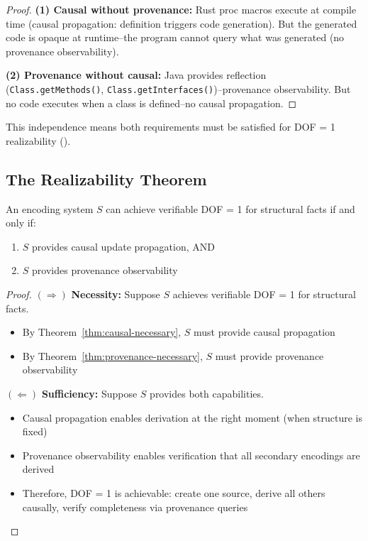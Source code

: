 \begin{proof}
\textbf{(1) Causal without provenance:} Rust proc macros execute at compile time (causal propagation: definition triggers code generation). But the generated code is opaque at runtime--the program cannot query what was generated (no provenance observability).

\textbf{(2) Provenance without causal:} Java provides reflection (\texttt{Class.getMethods()}, \texttt{Class.getInterfaces()})--provenance observability. But no code executes when a class is defined--no causal propagation.
\end{proof}

This independence means both requirements must be satisfied for DOF = 1 realizability ().

\subsection{The Realizability Theorem}\label{sec:realizability-theorem}

\begin{theorem}\label{thm:ssot-iff}
An encoding system $S$ can achieve verifiable DOF = 1 for structural facts if and only if:
\begin{enumerate}
\tightlist
\item $S$ provides causal update propagation, AND
\item $S$ provides provenance observability
\end{enumerate}
\end{theorem}

\begin{proof}
$(\Rightarrow)$ \textbf{Necessity:} Suppose $S$ achieves verifiable DOF = 1 for structural facts.
\begin{itemize}
\tightlist
\item By Theorem~\ref{thm:causal-necessary}, $S$ must provide causal propagation
\item By Theorem~\ref{thm:provenance-necessary}, $S$ must provide provenance observability
\end{itemize}

$(\Leftarrow)$ \textbf{Sufficiency:} Suppose $S$ provides both capabilities.
\begin{itemize}
\tightlist
\item Causal propagation enables derivation at the right moment (when structure is fixed)
\item Provenance observability enables verification that all secondary encodings are derived
\item Therefore, DOF = 1 is achievable: create one source, derive all others causally, verify completeness via provenance queries
\end{itemize}
\end{proof}

